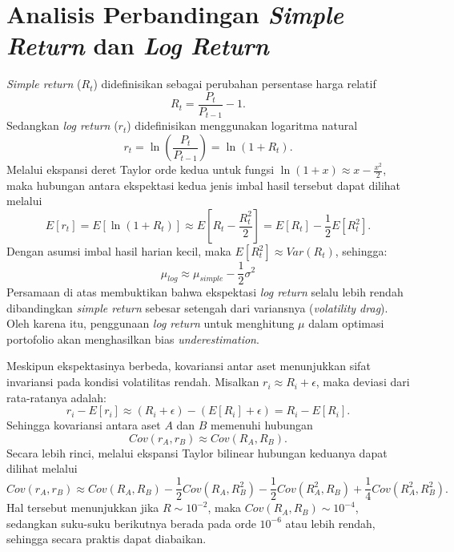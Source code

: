 \chapter{Analisis Perbandingan \textit{Simple Return} dan \textit{Log Return}}
\label{appendix:returns_comparison}

\textit{Simple return} ($R_t$) didefinisikan sebagai perubahan persentase harga relatif
\begin{equation}
    R_t = \frac{P_t}{P_{t-1}} - 1.
\end{equation}
Sedangkan \textit{log return} ($r_t$) didefinisikan menggunakan logaritma natural
\begin{equation}
    r_t = \ln\left(\frac{P_t}{P_{t-1}}\right) = \ln(1 + R_t).
\end{equation}
Melalui ekspansi deret Taylor orde kedua untuk fungsi $\ln(1+x) \approx x - \frac{x^2}{2}$, maka hubungan antara ekspektasi kedua jenis imbal hasil tersebut dapat dilihat melalui
\begin{equation}
    E[r_t] = E[\ln(1 + R_t)] \approx E\left[ R_t - \frac{R_t^2}{2} \right] = E[R_t] - \frac{1}{2} E[R_t^2].
\end{equation}
Dengan asumsi imbal hasil harian kecil, maka $E[R_t^2] \approx Var(R_t)$, sehingga:
\begin{equation}
    \mu_{log} \approx \mu_{simple} - \frac{1}{2} \sigma^2
\end{equation}
Persamaan di atas membuktikan bahwa ekspektasi \textit{log return} selalu lebih rendah dibandingkan \textit{simple return} sebesar setengah dari variansnya (\textit{volatility drag}). Oleh karena itu, penggunaan \textit{log return} untuk menghitung $\mu$ dalam optimasi portofolio akan menghasilkan bias \textit{underestimation}.

Meskipun ekspektasinya berbeda, kovariansi antar aset menunjukkan sifat invariansi pada kondisi volatilitas rendah. Misalkan $r_i \approx R_i + \epsilon$, maka deviasi dari rata-ratanya adalah:
\begin{equation}
    r_i - E[r_i] \approx (R_i + \epsilon) - (E[R_i] + \epsilon) = R_i - E[R_i].
\end{equation}
Sehingga kovariansi antara aset $A$ dan $B$ memenuhi hubungan
\begin{equation}
    Cov(r_A, r_B) \approx Cov(R_A, R_B).
\end{equation}
Secara lebih rinci, melalui ekspansi Taylor bilinear hubungan keduanya dapat dilihat melalui
\begin{equation}
    Cov(r_A, r_B) \approx Cov(R_A, R_B) - \frac{1}{2} Cov(R_A, R_B^2) - \frac{1}{2} Cov(R_A^2, R_B) + \frac{1}{4} Cov(R_A^2, R_B^2).
\end{equation}
Hal tersebut menunjukkan jika $R \sim 10^{-2}$, maka $Cov(R_A, R_B) \sim 10^{-4}$, sedangkan suku-suku berikutnya berada pada orde $10^{-6}$ atau lebih rendah, sehingga secara praktis dapat diabaikan.